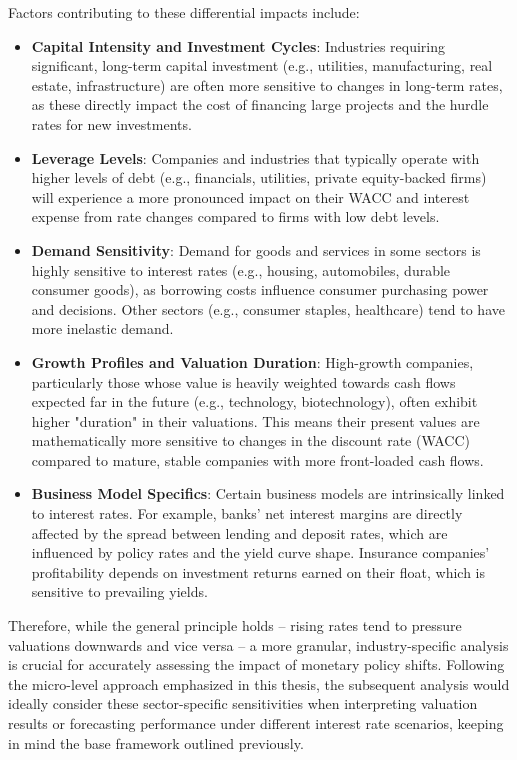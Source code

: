 Factors contributing to these differential impacts include:
\begin{itemize}
    \item \textbf{Capital Intensity and Investment Cycles}: Industries requiring significant, long-term capital investment (e.g., utilities, manufacturing, real estate, infrastructure) are often more sensitive to changes in long-term rates, as these directly impact the cost of financing large projects and the hurdle rates for new investments.
    \item \textbf{Leverage Levels}: Companies and industries that typically operate with higher levels of debt (e.g., financials, utilities, private equity-backed firms) will experience a more pronounced impact on their WACC and interest expense from rate changes compared to firms with low debt levels.
    \item \textbf{Demand Sensitivity}: Demand for goods and services in some sectors is highly sensitive to interest rates (e.g., housing, automobiles, durable consumer goods), as borrowing costs influence consumer purchasing power and decisions. Other sectors (e.g., consumer staples, healthcare) tend to have more inelastic demand.
    \item \textbf{Growth Profiles and Valuation Duration}: High-growth companies, particularly those whose value is heavily weighted towards cash flows expected far in the future (e.g., technology, biotechnology), often exhibit higher "duration" in their valuations. This means their present values are mathematically more sensitive to changes in the discount rate (WACC) compared to mature, stable companies with more front-loaded cash flows.
    \item \textbf{Business Model Specifics}: Certain business models are intrinsically linked to interest rates. For example, banks' net interest margins are directly affected by the spread between lending and deposit rates, which are influenced by policy rates and the yield curve shape. Insurance companies' profitability depends on investment returns earned on their float, which is sensitive to prevailing yields.
\end{itemize}

Therefore, while the general principle holds – rising rates tend to pressure valuations downwards and vice versa – a more granular, industry-specific analysis is crucial for accurately assessing the impact of monetary policy shifts. Following the micro-level approach emphasized in this thesis, the subsequent analysis would ideally consider these sector-specific sensitivities when interpreting valuation results or forecasting performance under different interest rate scenarios, keeping in mind the base framework outlined previously.

